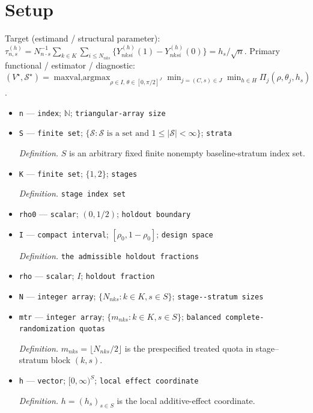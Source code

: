 \documentclass{article}
\begin{document}
\section{Setup}

Target (estimand / structural parameter): \(\tau^{(h)}_{n,s}=N_{n\cdot s}^{-1}\sum_{k\in K}\sum_{i\le N_{nks}}\{Y^{(h)}_{nksi}(1)-Y^{(h)}_{nksi}(0)\}=h_s/\sqrt n\).
Primary functional / estimator / diagnostic: \((V^{\star},\mathcal{S}^{\star})=\operatorname*{maxval,argmax}_{\rho\in I,\,\theta\in[0,\pi/2]^J}\min_{j=(C,s)\in J}\min_{h\in H}\Pi_j(\rho,\theta_j,h_s)\).
\begin{itemize}
  \item \texttt{n} --- \texttt{index}; \(\mathbb{N}\); \texttt{triangular-\allowbreak{}array size}
  \item \texttt{S} --- \texttt{finite set}; \(\{\mathcal S:\mathcal S\text{ is a set and }1\le |\mathcal S|<\infty\}\); \texttt{strata}
  \par\smallskip\noindent\emph{Definition.} \(S\) is an arbitrary fixed finite nonempty baseline-stratum index set.
  \item \texttt{K} --- \texttt{finite set}; \(\{1,2\}\); \texttt{stages}
  \par\smallskip\noindent\emph{Definition.} \texttt{stage index set}
  \item \texttt{rho0} --- \texttt{scalar}; \((0,1/2)\); \texttt{holdout boundary}
  \item \texttt{I} --- \texttt{compact interval}; \([\rho_0,1-\rho_0]\); \texttt{design space}
  \par\smallskip\noindent\emph{Definition.} \texttt{the admissible holdout fractions}
  \item \texttt{rho} --- \texttt{scalar}; \(I\); \texttt{holdout fraction}
  \item \texttt{N} --- \texttt{integer array}; \(\{N_{nks}:k\in K,s\in S\}\); \texttt{stage-\allowbreak{}-\allowbreak{}stratum sizes}
  \item \texttt{mtr} --- \texttt{integer array}; \(\{m_{nks}:k\in K,s\in S\}\); \texttt{balanced complete-\allowbreak{}randomization quotas}
  \par\smallskip\noindent\emph{Definition.} \(m_{nks}=\lfloor N_{nks}/2\rfloor\) is the prespecified treated quota in stage--stratum block \((k,s)\).
  \item \texttt{h} --- \texttt{vector}; \([0,\infty)^S\); \texttt{local effect coordinate}
  \par\smallskip\noindent\emph{Definition.} \(h=(h_s)_{s\in S}\) is the local additive-effect coordinate.

\end{itemize}
\end{document}
